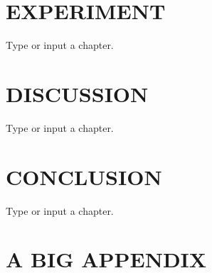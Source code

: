 \documentclass[dissertation]{uathesis}
\begin{document}
\begin{body}
\chapter{EXPERIMENT}
Type or input{} a chapter. \cite{rocket-themoon2167}

\chapter{DISCUSSION}
Type or input{} a chapter. \cite{rocket-themoon2167}

\chapter{CONCLUSION}
Type or input{} a chapter. \cite{rocket-themoon2167}


\renewcommand{\bibsection}{\topskip=1in\chapter*{REFERENCES}\topskip=0in \addcontentsline{toc}{chapter}{REFERENCES}}





\appendix

\chapter{A BIG APPENDIX}

\end{body}
\end{document}
